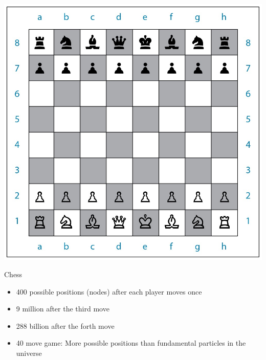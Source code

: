 \documentclass[10pt]{beamer}
\begin{document}
\begin{frame}[label={sec:org0c475f3}]{}
\begin{center}
\includegraphics[width=.75\textwidth]{./img/GAMES4_FIG03.08.jpg}
\end{center}
\end{frame}

\begin{frame}[label={sec:orga057086}]{}
\alert{Chess}
\begin{itemize}
\item 400 possible positions (nodes) after each player moves once
\item 9 million after the third move
\item 288 billion after the forth move
\item 40 move game: More possible positions than fundamental particles in the universe
\end{itemize}
\end{frame}
\end{document}
